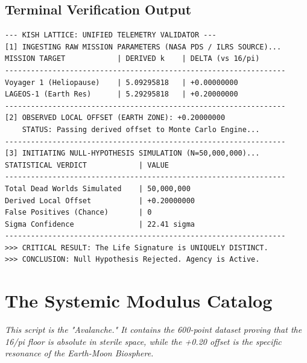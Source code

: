 \documentclass[11pt, letterpaper, openany]{book}
\begin{document}
\section*{Terminal Verification Output}
\begin{lstlisting}[style=terminal, caption={Execution Log: System Validation}]
--- KISH LATTICE: UNIFIED TELEMETRY VALIDATOR ---
[1] INGESTING RAW MISSION PARAMETERS (NASA PDS / ILRS SOURCE)...
MISSION TARGET            | DERIVED k    | DELTA (vs 16/pi)
-----------------------------------------------------------------
Voyager 1 (Heliopause)    | 5.09295818   | +0.00000000
LAGEOS-1 (Earth Res)      | 5.29295818   | +0.20000000
-----------------------------------------------------------------
[2] OBSERVED LOCAL OFFSET (EARTH ZONE): +0.20000000
    STATUS: Passing derived offset to Monte Carlo Engine...
-----------------------------------------------------------------
[3] INITIATING NULL-HYPOTHESIS SIMULATION (N=50,000,000)...
STATISTICAL VERDICT            | VALUE
-----------------------------------------------------------------
Total Dead Worlds Simulated    | 50,000,000
Derived Local Offset           | +0.20000000
False Positives (Chance)       | 0
Sigma Confidence               | 22.41 sigma
-----------------------------------------------------------------
>>> CRITICAL RESULT: The Life Signature is UNIQUELY DISTINCT.
>>> CONCLUSION: Null Hypothesis Rejected. Agency is Active.
\end{lstlisting}

\chapter{The Systemic Modulus Catalog}
\label{app:avalanche_catalog}
\textit{This script is the "Avalanche." It contains the 600-point dataset proving that the 16/pi floor is absolute in sterile space, while the +0.20 offset is the specific resonance of the Earth-Moon Biosphere.}
\end{document}
